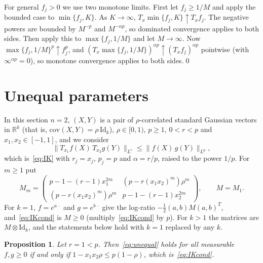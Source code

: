 \documentclass[11pt]{amsart}
\newtheorem{proposition}[theorem]{Proposition}
\theoremstyle{definition}
\newcommand{\R}{\mathbb{R}}
\newcommand{\Id}{\mathrm{Id}}
\begin{document}
For general $f_j>0$ we use two monotone limits. First let $f_j\ge1/M$ and apply the bounded case to
$\min\{f_j,K\}$. As $K\to\infty$, $T_x\min\{f_j,K\}\uparrow T_xf_j$. The negative powers are bounded by $M^{-p}$ and
$M^{-\alpha p}$, so dominated convergence applies to both sides. Then apply this to $\max\{f_j,1/M\}$ and let
$M\to\infty$. Now $\max\{f_j,1/M\}^p\uparrow f_j^p$, and $(T_x\max\{f_j,1/M\})^{\alpha p}\uparrow(T_xf_j)^{\alpha p}$
pointwise (with $\infty^{\alpha p}=0$), so monotone convergence applies to both sides.\qed

\section{Unequal parameters}\label{sec:unequal}
In this section $n=2$, $(X,Y)$ is a pair of $\rho$-correlated standard Gaussian vectors in $\R^k$ (that is,
$\mathrm{cov}(X,Y)=\rho\,\Id_k$), $\rho\in[0,1)$, $p\ge1$, $0<r<p$ and $x_1,x_2\in[-1,1]$, and we consider
\begin{equation}\label{eq:unequal}
\big\|T_{x_1}f(X)\,T_{x_2}g(Y)\big\|_{L^r}\le\big\|f(X)\,g(Y)\big\|_{L^p},
\end{equation}
which is~\eqref{eq:IK} with $r_j=x_j$, $p_j=p$ and $\alpha=r/p$, raised to the power $1/p$. For $m\ge1$ put
\[
M_m=\begin{pmatrix}p-1-(r-1)x_1^{2m}&(p-r(x_1x_2)^m)\rho^m\\(p-r(x_1x_2)^m)\rho^m&p-1-(r-1)x_2^{2m}\end{pmatrix},
\qquad M=M_1 .
\]
For $k=1$, $f=e^{a\,\cdot}$ and $g=e^{b\,\cdot}$ give the log-ratio $-\frac12(a,b)M(a,b)^T$, and~\eqref{eq:IKcond} is
$M\ge0$ (multiply~\eqref{eq:IKcond} by $p$). For $k>1$ the matrices are $M\otimes\Id_k$, and the statements below hold
with $k=1$ replaced by any $k$.

\begin{proposition}\label{prop:unequal}
Let $r=1<p$. Then~\eqref{eq:unequal} holds for all measurable $f,g\ge0$ if and only if $1-x_1x_2\rho\le p(1-\rho)$,
which is~\eqref{eq:IKcond}.
\end{proposition}
\end{document}
